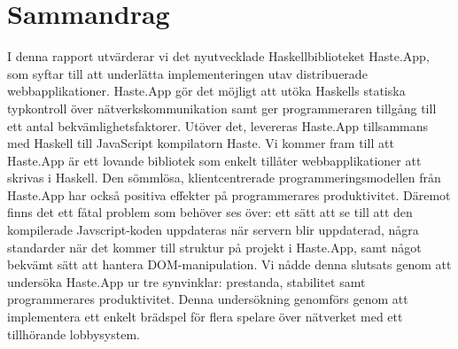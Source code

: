\documentclass[a4paper]{article}
\begin{document}
\section*{Sammandrag}
I denna rapport utvärderar vi det nyutvecklade Haskellbiblioteket Haste.App, som syftar till att underlätta implementeringen utav distribuerade webbapplikationer. Haste.App gör det möjligt att utöka Haskells statiska typkontroll över nätverkskommunikation samt ger programmeraren tillgång till ett antal bekvämlighetsfaktorer. Utöver det, levereras Haste.App tillsammans med Haskell till JavaScript kompilatorn Haste. Vi kommer fram till att Haste.App är ett lovande bibliotek som enkelt tillåter webbapplikationer att skrivas i Haskell. Den sömmlösa, klientcentrerade programmeringsmodellen från Haste.App har också positiva effekter på programmerares produktivitet. Däremot finns det ett fåtal problem som behöver ses över: ett sätt att se till att den kompilerade Javscript-koden uppdateras när servern blir uppdaterad, några standarder när det kommer till struktur på projekt i Haste.App, samt något bekvämt sätt att hantera DOM-manipulation. Vi nådde denna slutsats genom att undersöka Haste.App ur tre synvinklar: prestanda, stabilitet samt programmerares produktivitet. Denna undersökning genomförs genom att implementera ett enkelt brädspel för flera spelare över nätverket med ett tillhörande lobbysystem.



\end{document}
